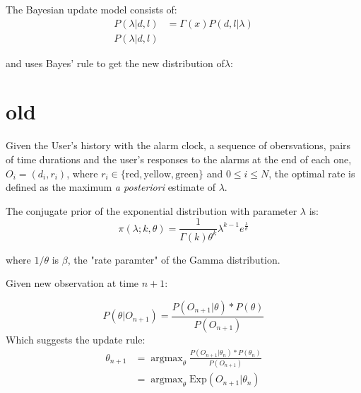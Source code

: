 \documentclass{article}
\DeclareMathOperator*{\argmax}{argmax}
\begin{document}
The Bayesian update model consists of:
\begin{align}
  P(\lambda|d, l) &= \Gamma(x) P(d, l|\lambda)\nonumber\\
  P(\lambda|d, l)
\end{align}


and  uses Bayes' rule to get the new distribution of$\lambda$:

















\section{old}

Given the User's history with the alarm clock, a sequence of obersvations, pairs of time durations and the user's responses to the alarms at the end of each one, $O_i = (d_i, r_i)$, where $r_i \in \{ \text{red},\text{yellow}, \text{green}\}$ and $0\leq i\leq N$, the optimal rate  is defined as the maximum \emph{a posteriori} estimate of $\lambda$.

The conjugate prior of the exponential distribution with parameter $\lambda$ is:
$$
 \pi(\lambda;k, \theta) = \frac{1}{\Gamma(k)\theta^k}\lambda^{k-1} e^\frac{\lambda}{\theta} 
$$

where $1/\theta$ is $\beta$,  the "rate paramter" of the Gamma distribution.

Given new observation at time $n+1$:

$$
P(\theta|O_{n+1}) = \frac{P(O_{n+1}|\theta) * P(\theta)}{P(O_{n+1})}
$$
Which suggests the update rule:
\begin{align}\label{eqn}
\theta_{n+1} &= \argmax_{\theta}   \frac{P(O_{n+1}|\theta_n) * P(\theta_n)}{P(O_{n+1})}\nonumber\\
 &= \argmax_{\theta} \text{Exp}(O_{n+1}|\theta_n)  \\ 
\end{align}
\end{document}
